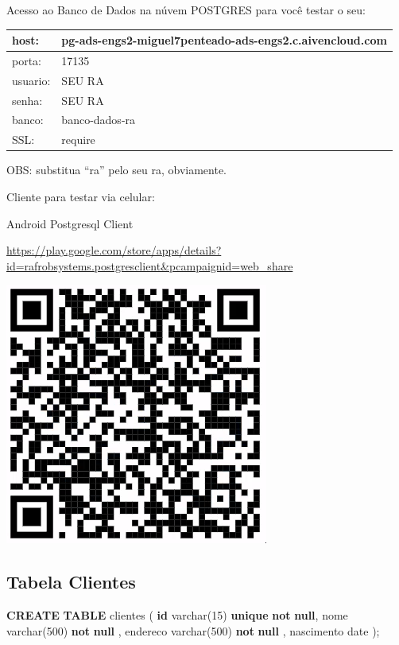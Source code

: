 \documentclass[
]{book}
\newenvironment{Shaded}{\begin{snugshade}}{\end{snugshade}}
\newcommand{\DataTypeTok}[1]{\textcolor[rgb]{0.13,0.29,0.53}{#1}}
\newcommand{\DecValTok}[1]{\textcolor[rgb]{0.00,0.00,0.81}{#1}}
\newcommand{\KeywordTok}[1]{\textcolor[rgb]{0.13,0.29,0.53}{\textbf{#1}}}
\newcommand{\NormalTok}[1]{#1}
\begin{document}
Acesso ao Banco de Dados na núvem POSTGRES para você testar o seu:

\begin{longtable}[]{@{}ll@{}}
\toprule\noalign{}
host: & pg-ads-engs2-miguel7penteado-ads-engs2.c.aivencloud.com \\
\midrule\noalign{}
\endhead
\bottomrule\noalign{}
\endlastfoot
porta: & 17135 \\
usuario: & SEU RA \\
senha: & SEU RA \\
banco: & banco-dados-ra \\
SSL: & require \\
\end{longtable}

OBS: substitua ``ra'' pelo seu ra, obviamente.

Cliente para testar via celular:

Android Postgresql Client

\url{https://play.google.com/store/apps/details?id=rafrobsystems.postgresclient&pcampaignid=web_share}

\includegraphics{images/clipboard-78059825.png}

\subsection{Tabela Clientes}\label{tabela-clientes}

\begin{Shaded}
\begin{Highlighting}[]
\KeywordTok{CREATE} \KeywordTok{TABLE}\NormalTok{ clientes}
\NormalTok{(}
\KeywordTok{id}         \DataTypeTok{varchar}\NormalTok{(}\DecValTok{15}\NormalTok{) }\KeywordTok{unique} \KeywordTok{not} \KeywordTok{null}\NormalTok{,}
\NormalTok{nome       }\DataTypeTok{varchar}\NormalTok{(}\DecValTok{500}\NormalTok{) }\KeywordTok{not} \KeywordTok{null}\NormalTok{ ,}
\NormalTok{endereco   }\DataTypeTok{varchar}\NormalTok{(}\DecValTok{500}\NormalTok{) }\KeywordTok{not} \KeywordTok{null}\NormalTok{ ,}
\NormalTok{nascimento }\DataTypeTok{date}
\NormalTok{);}
\end{Highlighting}
\end{Shaded}
\end{document}
